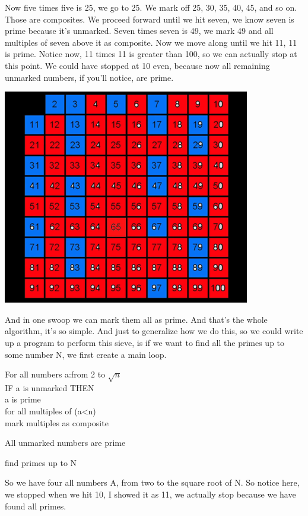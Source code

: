 \documentclass{report}
\begin{document}
 Now five times five is 25, we go to 25. We mark off 25, 30, 35, 40, 45, and so on. Those are composites. We proceed forward until we hit seven, we know seven is prime because it's unmarked. Seven times seven is 49, we mark 49 and all multiples of seven above it as composite. Now we move along until we hit 11, 11 is prime. Notice now, 11 times 11 is greater than 100, so we can actually stop at this point. We could have stopped at 10 even, because now all remaining unmarked numbers, if you'll notice, are prime.
\begin{center}
	\includegraphics[scale=1]{52.png}
\end{center}
 And in one swoop we can mark them all as prime. And that's the whole algorithm, it's so simple. And just to generalize how we do this, so we could write up a program to perform this sieve, is if we want to find all the primes up to some number N, we first create a main loop.\\
\begin{algorithm}[H]
	\vspace{3mm}
	For all numbers a:from 2 to $\sqrt{n}$\\
		\qquad IF a is unmarked THEN\\
		\qquad \qquad	a is prime\\
		\qquad \qquad	for all multiples of (a<n)\\
			\qquad \qquad \qquad	mark multiples as composite
	
	All unmarked numbers are prime
	\caption{find primes up to N}
\end{algorithm}
So we have four all numbers A, from two to the square root of N. So notice here, we stopped when we hit 10, I showed it as 11, we actually stop because we have found all primes.\\
\end{document}
